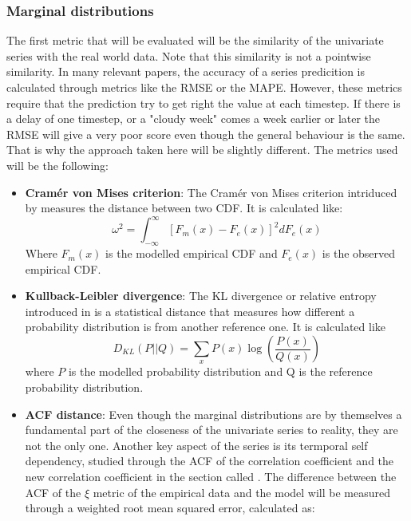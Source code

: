 \subsubsection{Marginal distributions}
The first metric that will be evaluated will be the similarity of the univariate series with the real world data. Note that this similarity is not a pointwise similarity. In many relevant papers, the accuracy of a series predicition is calculated through metrics like the RMSE or the MAPE. However, these metrics require that the prediction try to get right the value at each timestep. If there is a delay of one timestep, or a "cloudy week" comes a week earlier or later the RMSE will give a very poor score even though the general behaviour is the same. That is why the approach taken here will be slightly different. The metrics used will be the following:
\begin{itemize}
    \item \textbf{Cramér von Mises criterion}: The Cramér von Mises criterion intriduced by \cite{cramer_28} measures the distance between two CDF. It is calculated like:
    \begin{equation}
        \omega^2=\int_{-\infty}^{\infty}\left[F_m\left(x\right)-F_e\left(x\right)\right]^2dF_e\left(x\right)
    \end{equation}
    Where $F_m\left(x\right)$ is the modelled empirical CDF and $F_e\left(x\right)$ is the observed empirical CDF.
    \item \textbf{Kullback-Leibler divergence}: The KL divergence or relative entropy introduced in \cite{kullback_leibler_1951} is a statistical distance that measures how different a probability distribution is from another reference one. It is calculated like
    \begin{equation}
        D_{KL}\left(P||Q\right)=\sum_x P\left(x\right)\log{\left(\frac{P\left(x\right)}{Q\left(x\right)}\right)}
    \end{equation}
    where $P$ is the modelled probability distribution and Q is the reference probability distribution.
    \item \textbf{ACF distance}: Even though the marginal distributions are by themselves a fundamental part of the closeness of the univariate series to reality, they are not the only one. Another key aspect of the series is its termporal self dependency, studied through the ACF of the correlation coefficient and the new correlation coefficient in the section called . The difference between the ACF of the $\xi$ metric of the empirical data and the model will be measured through a weighted root mean squared error, calculated as:

\end{itemize}
